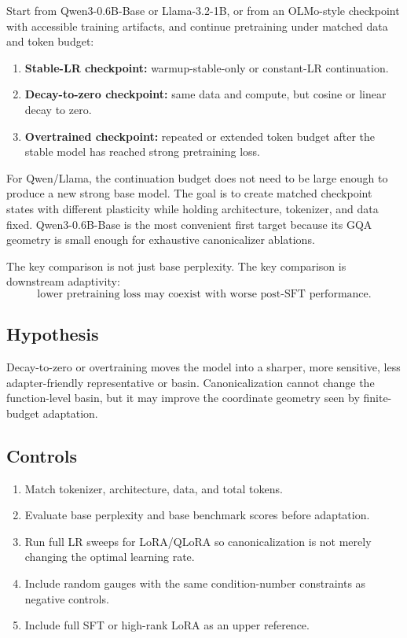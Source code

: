 \documentclass[11pt]{article}
\begin{document}
Start from Qwen3-0.6B-Base or Llama-3.2-1B, or from an OLMo-style checkpoint with accessible training artifacts, and continue pretraining under matched data and token budget:
\begin{enumerate}[leftmargin=*]
    \item \textbf{Stable-LR checkpoint:} warmup-stable-only or constant-LR continuation.
    \item \textbf{Decay-to-zero checkpoint:} same data and compute, but cosine or linear decay to zero.
    \item \textbf{Overtrained checkpoint:} repeated or extended token budget after the stable model has reached strong pretraining loss.
\end{enumerate}

For Qwen/Llama, the continuation budget does not need to be large enough to produce a new strong base model. The goal is to create matched checkpoint states with different plasticity while holding architecture, tokenizer, and data fixed. Qwen3-0.6B-Base is the most convenient first target because its GQA geometry is small enough for exhaustive canonicalizer ablations.

The key comparison is not just base perplexity. The key comparison is downstream adaptivity:
\[
    \text{lower pretraining loss may coexist with worse post-SFT performance.}
\]

\subsection{Hypothesis}

Decay-to-zero or overtraining moves the model into a sharper, more sensitive, less adapter-friendly representative or basin. Canonicalization cannot change the function-level basin, but it may improve the coordinate geometry seen by finite-budget adaptation.

\subsection{Controls}

\begin{enumerate}[leftmargin=*]
    \item Match tokenizer, architecture, data, and total tokens.
    \item Evaluate base perplexity and base benchmark scores before adaptation.
    \item Run full LR sweeps for LoRA/QLoRA so canonicalization is not merely changing the optimal learning rate.
    \item Include random gauges with the same condition-number constraints as negative controls.
    \item Include full SFT or high-rank LoRA as an upper reference.
\end{enumerate}
\end{document}
